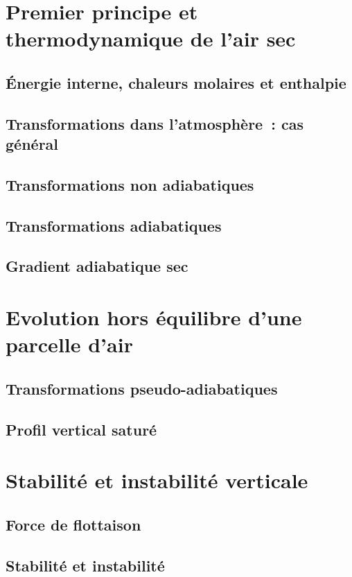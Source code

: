 \documentclass[a4paper,DIV16,10pt]{scrartcl}
\begin{document}
\mk \section{Premier principe et thermodynamique de l'air sec} 

	\sk \subsection{\'Energie interne, chaleurs molaires et enthalpie}
	

	\sk \subsection{Transformations dans l'atmosphère~: cas général}
	

	\sk \subsection{Transformations non adiabatiques}
	

	\sk \subsection{Transformations adiabatiques}
	

	\sk \subsection{Gradient adiabatique sec} \label{adiabsec}
	

\mk \section{Evolution hors équilibre d'une parcelle d'air}

	\sk \subsection{Transformations pseudo-adiabatiques}
	

	\sk \subsection{Profil vertical saturé}
	

\mk \section{Stabilité et instabilité verticale}

	\sk \subsection{Force de flottaison}
	

	\sk \subsection{Stabilité et instabilité}
	
	
\end{document}
